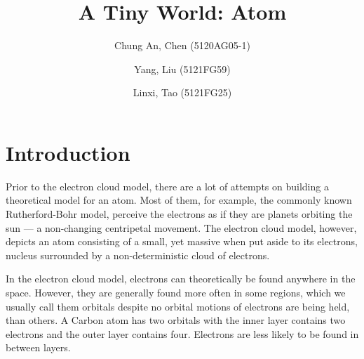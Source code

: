 \documentclass[acmtog]{acmart}
\begin{document}
\title{A Tiny World: Atom}

\author{Chung An, Chen (5120AG05-1)}
\author{Yang, Liu (5121FG59)}
\author{Linxi, Tao (5121FG25)}





\maketitle

\section{Introduction}
Prior to the electron cloud model, there are a lot of attempts on building a theoretical model for an atom. Most of them, for example, the commonly known Rutherford-Bohr model, perceive the electrons as if they are planets orbiting the sun --- a non-changing centripetal movement. The electron cloud model, however, depicts an atom consisting of a small, yet massive when put aside to its electrons, nucleus surrounded by a non-deterministic cloud of electrons.

In the electron cloud model, electrons can theoretically be found anywhere in the space. However, they are generally found more often in some regions, which we usually call them orbitals despite no orbital motions of electrons are being held, than others. A Carbon atom has two orbitals with the inner layer contains two electrons and the outer layer contains four. Electrons are less likely to be found in between layers.
\end{document}
